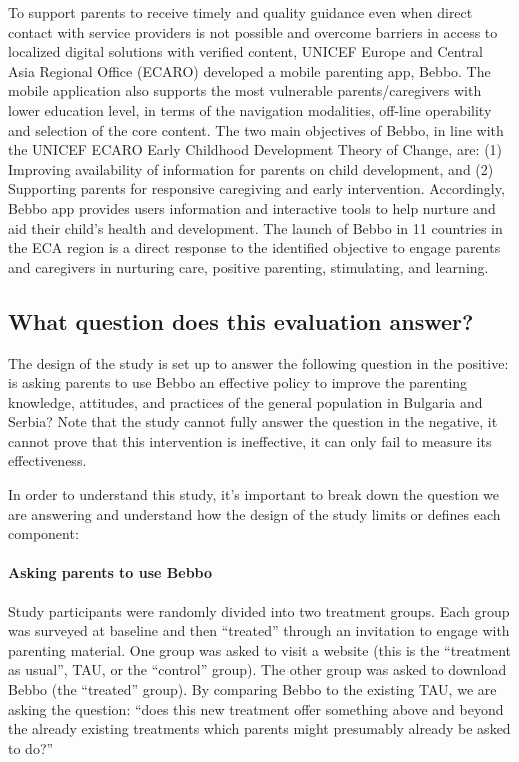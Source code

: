 \documentclass{article}
\begin{document}
To support parents to receive timely and quality guidance even when direct contact with service  providers is not possible and overcome barriers in access to localized digital solutions with verified  content, UNICEF Europe and Central Asia Regional Office (ECARO) developed a mobile parenting app,  Bebbo. The mobile application also supports the most vulnerable parents/caregivers with lower  education level, in terms of the navigation modalities, off-line operability and selection of the core  content. The two main objectives of Bebbo, in line with the UNICEF ECARO Early Childhood  Development Theory of Change, are: (1) Improving availability of information for parents on child  development, and (2) Supporting parents for responsive caregiving and early intervention.  Accordingly, Bebbo app provides users information and interactive tools to help nurture and aid their  child’s health and development. The launch of Bebbo in 11 countries in the ECA region is a direct  response to the identified objective to engage parents and caregivers in nurturing care, positive  parenting, stimulating, and learning.

\subsection*{What question does this evaluation answer?}
The design of the study is set up to answer the following question in the positive: is asking parents to use Bebbo an effective policy to improve the parenting knowledge, attitudes, and practices of the general population in Bulgaria and Serbia? Note that the study cannot fully answer the question in the negative, it cannot prove that this intervention is ineffective, it can only fail to measure its effectiveness.

In order to understand this study, it’s important to break down the question we are answering and understand how the design of the study limits or defines each component:

\paragraph*{Asking parents to use Bebbo}
Study participants were randomly divided into two treatment groups. Each group was surveyed at baseline and then “treated” through an invitation to engage with parenting material. One group was asked to visit a website (this is the “treatment as usual”, TAU, or the “control” group). The other group was asked to download Bebbo (the “treated” group). By comparing Bebbo to the existing TAU, we are asking the question: “does this new treatment offer something above and beyond the already existing treatments which parents might presumably already be asked to do?”
\end{document}
